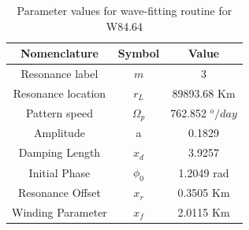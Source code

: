 \documentclass{article}
\begin{document}
\begin{table}
\centering
\begin{tabular}{|c|c|c|}
\hline
\textbf{Nomenclature} & \textbf{Symbol} & \textbf{Value} \\
\hline
Resonance label & $m$ & 3 \\
\hline
Resonance location & $r_{L}$ & 89893.68 Km \\
\hline
Pattern speed & $\Omega_{p}$ & 762.852 $^{o}/day$ \\
\hline
Amplitude & a & 0.1829 \\
\hline
Damping Length & $x_{d}$ & 3.9257 \\
\hline
Initial Phase & $\phi_{0}$ & 1.2049 rad \\
\hline
Resonance Offset & $x_{r}$ & 0.3505 Km \\
\hline
Winding Parameter & $x_{f}$ & 2.0115 Km \\
\hline
\end{tabular}
\caption{Parameter values for wave-fitting routine for W84.64}
\end{table}




\end{document}
